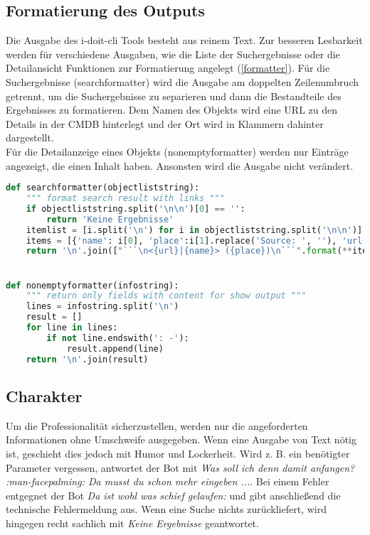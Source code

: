 \subsection{Formatierung des Outputs}
Die Ausgabe des i-doit-cli Tools besteht aus reinem Text. Zur besseren Lesbarkeit werden für verschiedene Ausgaben, wie die Liste der Suchergebnisse oder die Detailansicht Funktionen zur Formatierung angelegt (\autoref{formatter}).
Für die Suchergebnisse (searchformatter) wird die Ausgabe am doppelten Zeilenumbruch getrennt, um die Suchergebnisse zu separieren und dann die Bestandteile des Ergebnisses zu formatieren. Dem Namen des Objekts wird eine URL zu den Details in der \acs{CMDB} hinterlegt und der Ort wird in Klammern dahinter dargestellt.\\
Für die Detailanzeige eines Objekts (nonemptyformatter) werden nur Einträge angezeigt, die einen Inhalt haben. Ansonsten wird die Ausgabe nicht verändert.

\begin{lstlisting}[language=python, label=formatter, caption=Funktionen zur Formatierung]
def searchformatter(objectliststring):
    """ format search result with links """
    if objectliststring.split('\n\n')[0] == '':
        return 'Keine Ergebnisse'
    itemlist = [i.split('\n') for i in objectliststring.split('\n\n')]  # get single lines for every search result item
    items = [{'name': i[0], 'place':i[1].replace('Source: ', ''), 'url': i[2].replace('Link: ', '')} for i in itemlist]  # save information to dict and remove description in text
    return '\n'.join(["```\n<{url}|{name}> ({place})\n```".format(**item) for item in items])


def nonemptyformatter(infostring):
    """ return only fields with content for show output """
    lines = infostring.split('\n')
    result = []
    for line in lines:
        if not line.endswith(': -'):
            result.append(line)
    return '\n'.join(result)
\end{lstlisting}


\subsection{Charakter}
Um die Professionalität sicherzustellen, werden nur die angeforderten Informationen ohne Umschweife ausgegeben. Wenn eine Ausgabe von Text nötig ist, geschieht dies jedoch mit Humor und Lockerheit. Wird z. B. ein benötigter Parameter vergessen, antwortet der Bot mit \textit{Was soll ich denn damit anfangen? :man-facepalming: Da musst du schon mehr eingeben ...}. Bei einem Fehler entgegnet der Bot \textit{Da ist wohl was schief gelaufen:} und gibt anschließend die technische Fehlermeldung aus. Wenn eine Suche nichts zurückliefert, wird hingegen recht sachlich mit \textit{Keine Ergebnisse} geantwortet. 

